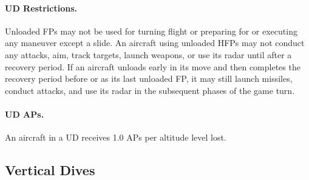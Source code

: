 {\paragraph{UD Restrictions.} Unloaded FPs may not be used for turning flight or preparing for or executing any maneuver except a slide. An aircraft using unloaded HFPs may not conduct any attacks, aim, track targets, launch weapons, or use its radar until after a recovery period. If an aircraft unloads early in its move and then completes the recovery period before or as its last unloaded FP, it may still launch missiles, conduct attacks, and use its radar in the subsequent phases of the game turn.

\paragraph{UD APs.} An aircraft in a UD receives 1.0 APs per altitude level lost.

}

\subsection{Vertical Dives}
\label{rule:vertical-dives}

